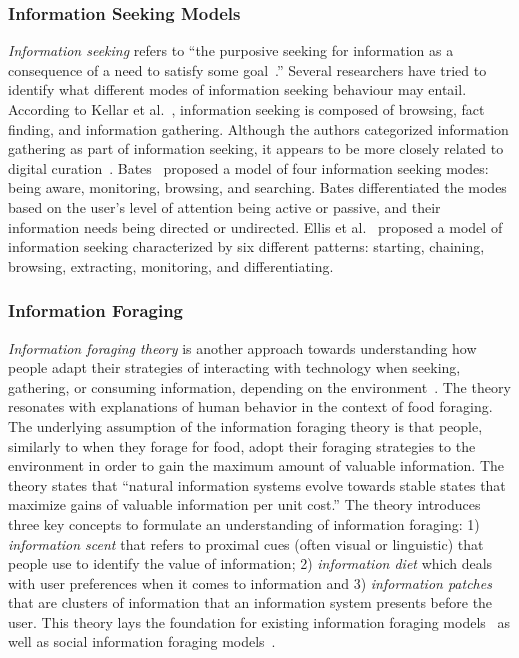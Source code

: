 \documentclass{sigchi}
\begin{document}
\subsubsection{Information Seeking Models}
\textit{Information seeking} refers to ``the purposive seeking for information as a consequence of a need to satisfy some goal~\cite{wilson2000human}.'' Several researchers have tried to identify what different modes of information seeking behaviour may entail. According to Kellar et al.~\cite{kellar2006goal}, information seeking is composed of browsing, fact finding, and information gathering. Although the authors categorized information gathering as part of information seeking, it appears to be more closely related to digital curation~\cite{beagrie2008digital,whittaker2011personal}. Bates~\cite{bates1986exploratory,bates2002toward} proposed a model of four information seeking modes: being aware, monitoring, browsing, and searching. Bates differentiated the modes based on the user's level of attention being active or passive, and their information needs being directed or undirected. Ellis et al.~\cite{ellis1989behavioural,ellis1993comparison,ellis1997modelling} proposed a model of information seeking characterized by six different patterns: starting, chaining, browsing, extracting, monitoring, and differentiating. 

\subsubsection{Information Foraging}
\textit{Information foraging theory} is another approach towards understanding how people adapt their strategies of interacting with technology when seeking, gathering, or consuming information, depending on the environment~\cite{pirolli1999information}. The theory resonates with explanations of human behavior in the context of food foraging. The underlying assumption of the information foraging theory is that people, similarly to when they forage for food, adopt their foraging strategies to the environment in order to gain the maximum amount of valuable information. The theory states that ``natural information systems evolve towards stable states that maximize gains of valuable information per unit cost.''
%
The theory introduces three key concepts to formulate an understanding of information foraging: 
1) \textit{information scent} that refers to proximal cues (often visual or linguistic) that people use to identify the value of information; 2) \textit{information diet} which deals with user preferences when it comes to information and 3) \textit{information patches} that are clusters of information that an information system presents before the user. This theory lays the foundation for existing information foraging models~\cite{fu2007snif,kitajima2000comprehension} as well as social information foraging models~\cite{pirolli2009elementary,fu2008microstructures}.  
\end{document}
